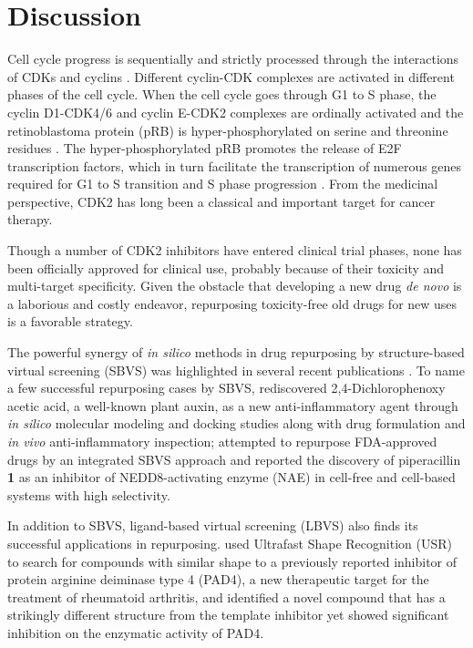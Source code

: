 \documentclass[10pt,letterpaper]{article}
\begin{document}
\section*{Discussion}

Cell cycle progress is sequentially and strictly processed through the interactions of CDKs and cyclins \cite{1612}. Different cyclin-CDK complexes are activated in different phases of the cell cycle. When the cell cycle goes through G1 to S phase, the cyclin D1-CDK4/6 and cyclin E-CDK2 complexes are ordinally activated and the retinoblastoma protein (pRB) is hyper-phosphorylated on serine and threonine residues \cite{1613}. The hyper-phosphorylated pRB promotes the release of E2F transcription factors, which in turn facilitate the transcription of numerous genes required for G1 to S transition and S phase progression \cite{1614}. From the medicinal perspective, CDK2 has long been a classical and important target for cancer therapy.

Though a number of CDK2 inhibitors have entered clinical trial phases, none has been officially approved for clinical use, probably because of their toxicity and multi-target specificity. Given the obstacle that developing a new drug \textit{de novo} is a laborious and costly endeavor, repurposing toxicity-free old drugs for new uses is a favorable strategy.

The powerful synergy of \textit{in silico} methods in drug repurposing by structure-based virtual screening (SBVS) was highlighted in several recent publications \cite{1384}. To name a few successful repurposing cases by SBVS, \cite{1507} rediscovered 2,4-Dichlorophenoxy acetic acid, a well-known plant auxin, as a new anti-inflammatory agent through \textit{in silico} molecular modeling and docking studies along with drug formulation and \textit{in vivo} anti-inflammatory inspection; \cite{1506} attempted to repurpose FDA-approved drugs by an integrated SBVS approach and reported the discovery of piperacillin \textbf{1} as an inhibitor of NEDD8-activating enzyme (NAE) in cell-free and cell-based systems with high selectivity.

In addition to SBVS, ligand-based virtual screening (LBVS) also finds its successful applications in repurposing. \cite{1504} used Ultrafast Shape Recognition (USR) \cite{1379} to search for compounds with similar shape to a previously reported inhibitor of protein arginine deiminase type 4 (PAD4), a new therapeutic target for the treatment of rheumatoid arthritis, and identified a novel compound that has a strikingly different structure from the template inhibitor yet showed significant inhibition on the enzymatic activity of PAD4.
\end{document}
